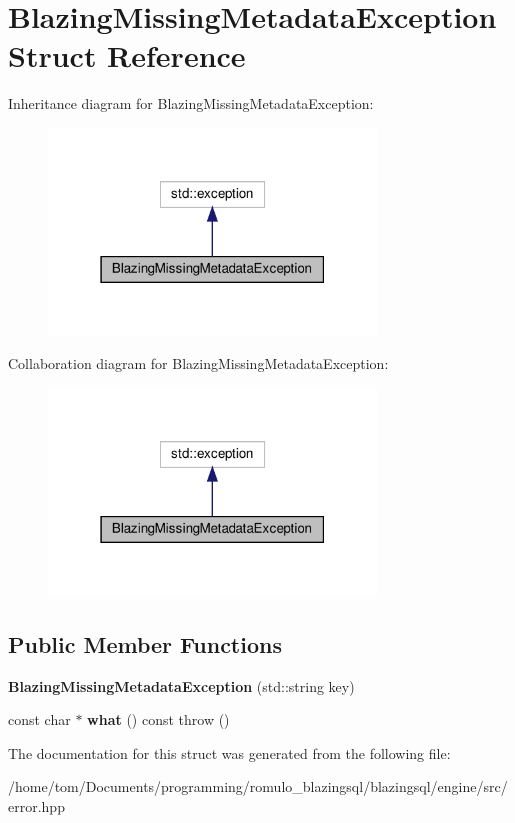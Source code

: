 \hypertarget{structBlazingMissingMetadataException}{}\section{Blazing\+Missing\+Metadata\+Exception Struct Reference}
\label{structBlazingMissingMetadataException}


Inheritance diagram for Blazing\+Missing\+Metadata\+Exception\+:\nopagebreak
\begin{figure}[H]
\begin{center}
\leavevmode
\includegraphics[width=247pt]{structBlazingMissingMetadataException__inherit__graph}
\end{center}
\end{figure}


Collaboration diagram for Blazing\+Missing\+Metadata\+Exception\+:\nopagebreak
\begin{figure}[H]
\begin{center}
\leavevmode
\includegraphics[width=247pt]{structBlazingMissingMetadataException__coll__graph}
\end{center}
\end{figure}
\subsection*{Public Member Functions}
\begin{DoxyCompactItemize}
\item 
\mbox{\label{structBlazingMissingMetadataException_a5d6dac7b715ad5737b12999b41f36f4c}} 
{\bfseries Blazing\+Missing\+Metadata\+Exception} (std\+::string key)
\item 
\mbox{\label{structBlazingMissingMetadataException_a39eac0285bad513241cc214111206769}} 
const char $\ast$ {\bfseries what} () const  throw ()
\end{DoxyCompactItemize}


The documentation for this struct was generated from the following file\+:\begin{DoxyCompactItemize}
\item 
/home/tom/\+Documents/programming/romulo\+\_\+blazingsql/blazingsql/engine/src/error.\+hpp\end{DoxyCompactItemize}
